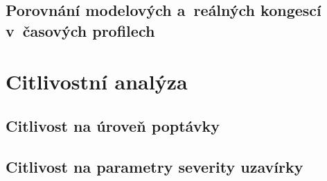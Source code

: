 \subsection{Porovnání modelových a~reálných kongescí v~časových profilech}
\label{subsec:temporal-profiles}
%
%
%


\section{Citlivostní analýza}
\label{sec:citlivost}


\subsection{Citlivost na úroveň poptávky}

\subsection{Citlivost na parametry severity uzavírky}

